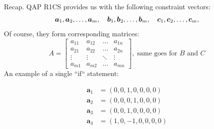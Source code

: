 \documentclass{zkdl-presentation-template}
\begin{document}
    \begin{frame}{Recap. QAP}
        R1CS provides us with the following constraint vectors:
        \vspace{-8pt}
        \begin{equation*}
            \boldsymbol{a}_1, \boldsymbol{a}_2, \dots, \boldsymbol{a}_m, \quad
            \boldsymbol{b}_1, \boldsymbol{b}_2, \dots, \boldsymbol{b}_m, \quad
            \boldsymbol{c}_1, \boldsymbol{c}_2, \dots, \boldsymbol{c}_m, 
            \vspace{-5pt}
        \end{equation*}\pause
        Of course, they form corresponding matrices:
        \vspace{-5pt}
        \begin{equation*}
            A = \begin{bmatrix}
                a_{11} & a_{12} & \dots & a_{1n} \\
                a_{21} & a_{22} & \dots & a_{2n} \\
                \vdots & \vdots & \ddots & \vdots \\
                a_{m1} & a_{m2} & \dots & a_{mn}
            \end{bmatrix}, \;
            \text{same goes for $B$ and $C$}
        \end{equation*}\pause
        An example of a single ``if`` statement:
        \begin{center}
            \begin{minipage}{0.4\textwidth}
            \vspace{-15pt}
            {\small \begin{align*}
                \boldsymbol{a}_1 &= (0, 0, 1, 0, 0, 0, 0) \\
                \boldsymbol{a}_2 &= (0, 0, 0, 1, 0, 0, 0) \\
                \boldsymbol{a}_3 &= (0, 0, 1, 0, 0, 0, 0) \\
                \boldsymbol{a}_4 &= (1, 0, -1, 0, 0, 0, 0)
            \end{align*}}
            \end{minipage}
            \begin{minipage}{0.5\textwidth}
                \vspace{-10pt}
\end{minipage}
\end{center}
\end{frame}
\end{document}
